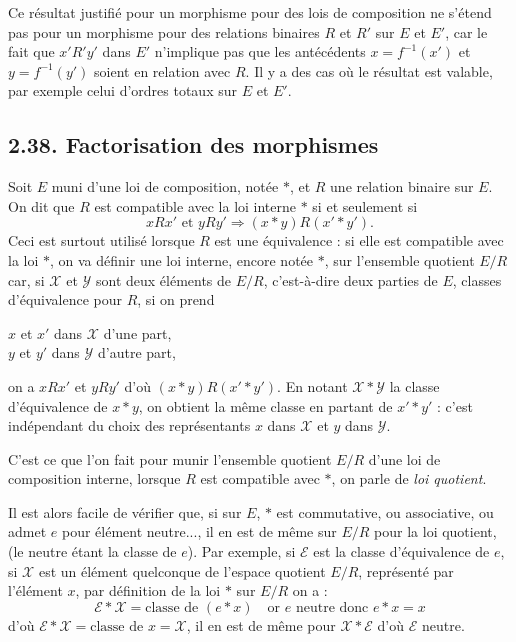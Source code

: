 Ce résultat justifié pour un morphisme pour des lois de composition ne s'étend pas pour un morphisme pour des relations binaires $R$ et $R'$ sur $E$ et $E'$, car le fait que $x'R'y'$ dans $E'$ n'implique pas que les antécédents $x=f^{-1}(x')$ et $y=f^{-1}(y')$ soient en relation avec $R$. Il y a des cas où le résultat est valable, par exemple celui d'ordres totaux sur $E$ et $E'$.

\subsection*{2.38. Factorisation des morphismes}

Soit $E$ muni d'une loi de composition, notée $*$, et $R$ une relation binaire sur $E$. On dit que $R$ est compatible avec la loi interne $*$ si et seulement si
\[
xRx'\text{ et }yRy'\Rightarrow(x*y)R(x'*y').
\]
Ceci est surtout utilisé lorsque $R$ est une équivalence : si elle est compatible avec la loi $*$, on va définir une loi interne, encore notée $*$, sur l'ensemble quotient $E/R$ car, si $\mathcal X$ et $\mathcal Y$ sont deux éléments de $E/R$, c'est-à-dire deux parties de $E$, classes d'équivalence pour $R$, si on prend
\begin{center}
$x$ et $x'$ dans $\mathcal X$ d'une part,\\
$y$ et $y'$ dans $\mathcal Y$ d'autre part,
\end{center}
on a $xRx'$ et $yRy'$ d'où $(x*y)R(x'*y')$. En notant $\mathcal X*\mathcal Y$ la classe d'équivalence de $x*y$, on obtient la même classe en partant de $x'*y'$ : c'est indépendant du choix des représentants $x$ dans $\mathcal X$ et $y$ dans $\mathcal Y$.

C'est ce que l'on fait pour munir l'ensemble quotient $E/R$ d'une loi de composition interne, lorsque $R$ est compatible avec $*$, on parle de \emph{loi quotient}.

Il est alors facile de vérifier que, si sur $E$, $*$ est commutative, ou associative, ou admet $e$ pour élément neutre..., il en est de même sur $E/R$ pour la loi quotient, (le neutre étant la classe de $e$). Par exemple, si $\mathcal E$ est la classe d'équivalence de $e$, si $\mathcal X$ est un élément quelconque de l'espace quotient $E/R$, représenté par l'élément $x$, par définition de la loi $*$ sur $E/R$ on a :
\[
\mathcal E*\mathcal X=\text{classe de }(e*x)\quad\text{or }e\text{ neutre donc }e*x=x
\]
d'où $\mathcal E*\mathcal X=\text{classe de }x=\mathcal X$, il en est de même pour $\mathcal X*\mathcal E$ d'où $\mathcal E$ neutre. \bookend

